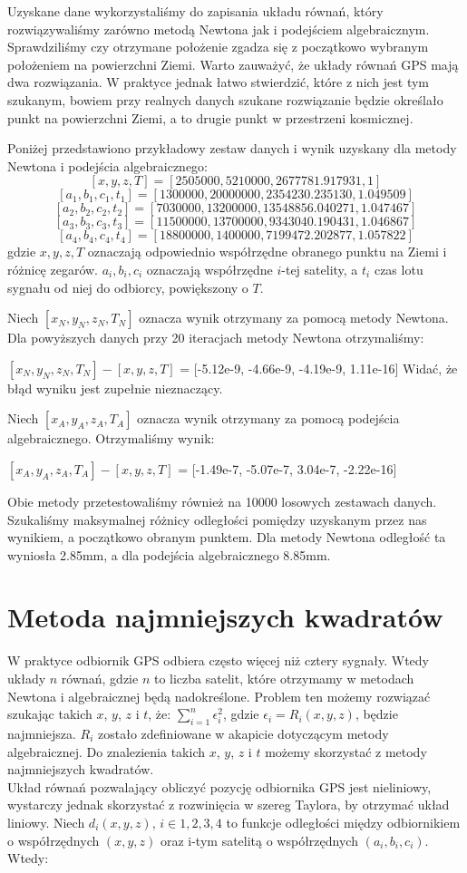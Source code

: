 \documentclass[]{mwart}
\theoremstyle{definition}
\begin{document}
Uzyskane dane wykorzystaliśmy do zapisania układu równań, który rozwiązywaliśmy zarówno metodą Newtona jak i podejściem algebraicznym. Sprawdziliśmy czy otrzymane położenie zgadza się z początkowo wybranym położeniem na powierzchni Ziemi. Warto zauważyć, że układy równań GPS mają dwa rozwiązania. W praktyce jednak łatwo stwierdzić, które z nich jest tym szukanym, bowiem przy realnych danych szukane rozwiązanie będzie określało punkt na powierzchni Ziemi, a to drugie punkt w przestrzeni kosmicznej.

Poniżej przedstawiono przykładowy zestaw danych i wynik uzyskany dla metody Newtona i podejścia algebraicznego:
$$ [x, y, z, T] = [2505000, 5210000, 2677781.917931, 1] $$
$$ [a_1, b_1, c_1, t_1] = [1300000, 20000000, 2354230.235130, 1.049509] $$
$$ [a_2, b_2, c_2, t_2] = [7030000, 13200000, 13548856.040271, 1.047467] $$
$$ [a_3, b_3, c_3, t_3] = [11500000, 13700000, 9343040.190431, 1.046867] $$
$$ [a_4, b_4, c_4, t_4] = [18800000, 1400000, 7199472.202877, 1.057822] $$
gdzie $x, y, z, T$ oznaczają odpowiednio współrzędne obranego punktu na Ziemi i różnicę zegarów. $a_i, b_i, c_i $ oznaczają współrzędne $i$-tej satelity, a $t_i$ czas lotu sygnału od niej do odbiorcy, powiększony o $T$.

Niech $[x_N, y_N, z_N, T_N]$ oznacza wynik otrzymany za pomocą metody Newtona. Dla powyższych danych przy 20 iteracjach metody Newtona otrzymaliśmy:

$ [x_N, y_N, z_N, T_N] - [x, y, z, T] $ = [-5.12e-9, -4.66e-9, -4.19e-9, 1.11e-16]
Widać, że błąd wyniku jest zupełnie nieznaczący.

Niech $[x_A, y_A, z_A, T_A]$ oznacza wynik otrzymany za pomocą podejścia algebraicznego. Otrzymaliśmy wynik:

$ [x_A, y_A, z_A, T_A] - [x, y, z, T] $ = [-1.49e-7, -5.07e-7, 3.04e-7, -2.22e-16]

Obie metody przetestowaliśmy również na 10000 losowych zestawach danych. Szukaliśmy maksymalnej różnicy odległości pomiędzy uzyskanym przez nas wynikiem, a początkowo obranym punktem. Dla metody Newtona odległość ta wyniosła 2.85mm, a dla podejścia algebraicznego 8.85mm.

\section*{Metoda najmniejszych kwadratów}

W praktyce odbiornik GPS odbiera często więcej niż cztery sygnały. Wtedy układy $n$ równań, gdzie $n$ to liczba satelit, które otrzymamy w metodach Newtona i algebraicznej będą nadokreślone.
Problem ten możemy rozwiązać szukając takich $x$, $y$, $z$ i $t$, że: $\sum_{i=1}^{n} \epsilon_i^2$, gdzie $\epsilon_i = R_i(x,y,z)$, będzie najmniejsza. $R_i$ zostało zdefiniowane w akapicie
dotyczącym metody algebraicznej. Do znalezienia takich $x$, $y$, $z$ i $t$ możemy skorzystać z metody najmniejszych kwadratów.
\\
Układ równań pozwalający obliczyć pozycję odbiornika GPS jest nieliniowy, wystarczy jednak skorzystać z rozwinięcia w szereg Taylora, by otrzymać układ liniowy.
Niech $d_i(x,y,z)$, $i \in {1,2,3,4}$ to funkcje odległości między odbiornikiem o współrzędnych $(x,y,z)$ oraz i-tym satelitą o współrzędnych $(a_i,b_i,c_i)$. Wtedy:
\end{document}
